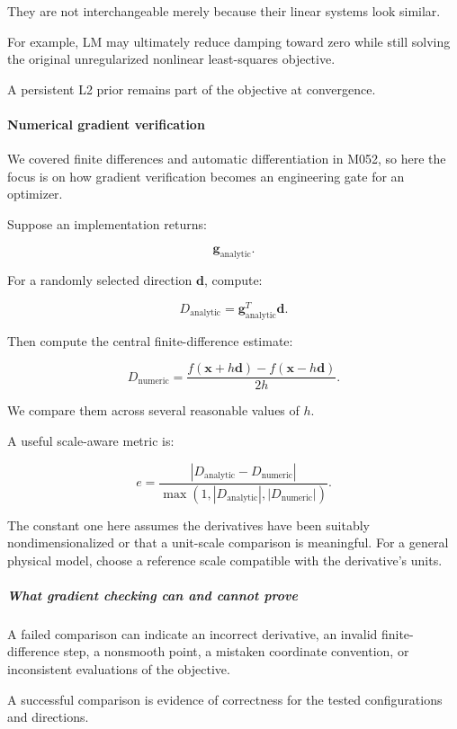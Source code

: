 They are not interchangeable merely because their linear systems look similar.

For example, LM may ultimately reduce damping toward zero while still solving the original unregularized nonlinear least-squares objective.

A persistent L2 prior remains part of the objective at convergence.

\paragraph{Numerical gradient verification}\label{numerical-gradient-verification}

We covered finite differences and automatic differentiation in M052, so here the focus is on how gradient verification becomes an engineering gate for an optimizer.

Suppose an implementation returns:

\[
\mathbf g_{\mathrm{analytic}}.
\]

For a randomly selected direction \(\mathbf d\), compute:

\[
D_{\mathrm{analytic}} = \mathbf g_{\mathrm{analytic}}^T\mathbf d.
\]

Then compute the central finite-difference estimate:

\[
D_{\mathrm{numeric}} = \frac{ f(\mathbf x+h\mathbf d) - f(\mathbf x-h\mathbf d) }{2h}.
\]

We compare them across several reasonable values of \(h\).

A useful scale-aware metric is:

\[
\boxed{ e= \frac{ |D_{\mathrm{analytic}}-D_{\mathrm{numeric}}| }{ \max(1,|D_{\mathrm{analytic}}|,|D_{\mathrm{numeric}}|) } }.
\]

The constant one here assumes the derivatives have been suitably nondimensionalized or that a unit-scale comparison is meaningful. For a general physical model, choose a reference scale compatible with the derivative's units.

\subparagraph{What gradient checking can and cannot prove}\label{what-gradient-checking-can-and-cannot-prove}

A failed comparison can indicate an incorrect derivative, an invalid finite-difference step, a nonsmooth point, a mistaken coordinate convention, or inconsistent evaluations of the objective.

A successful comparison is evidence of correctness for the tested configurations and directions.

